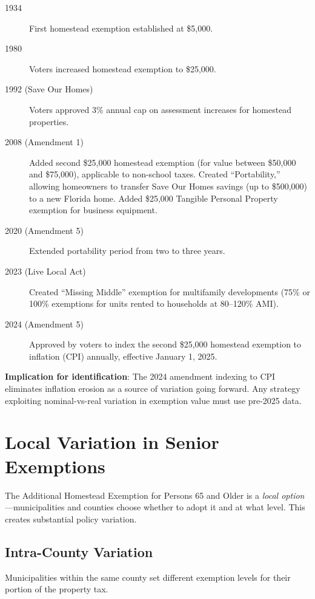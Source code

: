 \documentclass[11pt]{article}
\begin{document}
\begin{description}
    \item[1934] First homestead exemption established at \$5,000.
    \item[1980] Voters increased homestead exemption to \$25,000.
    \item[1992 (Save Our Homes)] Voters approved 3\% annual cap on assessment increases for homestead properties.
    \item[2008 (Amendment 1)] Added second \$25,000 homestead exemption (for value between \$50,000 and \$75,000), applicable to non-school taxes. Created ``Portability,'' allowing homeowners to transfer Save Our Homes savings (up to \$500,000) to a new Florida home. Added \$25,000 Tangible Personal Property exemption for business equipment.
    \item[2020 (Amendment 5)] Extended portability period from two to three years.
    \item[2023 (Live Local Act)] Created ``Missing Middle'' exemption for multifamily developments (75\% or 100\% exemptions for units rented to households at 80--120\% AMI).
    \item[2024 (Amendment 5)] Approved by voters to index the second \$25,000 homestead exemption to inflation (CPI) annually, effective January 1, 2025.
\end{description}

\textbf{Implication for identification}: The 2024 amendment indexing to CPI eliminates inflation erosion as a source of variation going forward. Any strategy exploiting nominal-vs-real variation in exemption value must use pre-2025 data.

\section{Local Variation in Senior Exemptions}

The Additional Homestead Exemption for Persons 65 and Older is a \textit{local option}---municipalities and counties choose whether to adopt it and at what level. This creates substantial policy variation.

\subsection{Intra-County Variation}

Municipalities within the same county set different exemption levels for their portion of the property tax.
\end{document}
